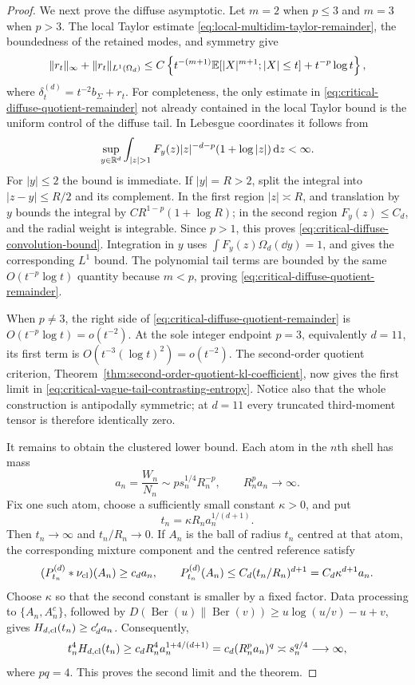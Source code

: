 \begin{proof}
We next prove the diffuse asymptotic.  Let
\(m=2\) when \(p\le3\) and \(m=3\) when \(p>3\).  The local Taylor estimate
\eqref{eq:local-multidim-taylor-remainder}, the boundedness of the retained
modes, and symmetry give
\begin{equation}\label{eq:critical-diffuse-quotient-remainder}
 \|r_t\|_\infty+\|r_t\|_{L^1(\Omega_d)}
 \le C\left\{
 t^{-(m+1)}\mathbb{E}[|X|^{m+1};|X|\le t]+t^{-p}\log t
 \right\},
\end{equation}
where
\(\delta_t^{(d)}=t^{-2}b_\Sigma+r_t\).  For completeness, the only
estimate in \eqref{eq:critical-diffuse-quotient-remainder} not already
contained in the local Taylor bound is the uniform control of the diffuse
tail.  In Lebesgue coordinates it follows from
\begin{equation}\label{eq:critical-diffuse-convolution-bound}
 \sup_{y\in\RR^d}\int_{|z|>1}F_y(z)|z|^{-d-p}
 (1+\log|z|)\dd z<\infty.
\end{equation}
For \(|y|\le2\) the bound is immediate.  If \(|y|=R>2\), split the
integral into \(|z-y|\le R/2\) and its complement.  In the first region
\(|z|\asymp R\), and translation by \(y\) bounds the integral by
\(CR^{1-p}(1+\log R)\); in the second region \(F_y(z)\le C_d\), and the
radial weight is integrable.  Since \(p>1\), this proves
\eqref{eq:critical-diffuse-convolution-bound}.  Integration in \(y\) uses
\(\int F_y(z)\Omega_d(\dd y)=1\), and gives the corresponding \(L^1\)
bound.  The polynomial tail terms are bounded by the same
\(O(t^{-p}\log t)\) quantity because \(m<p\), proving
\eqref{eq:critical-diffuse-quotient-remainder}.

When \(p\ne3\), the right side of
\eqref{eq:critical-diffuse-quotient-remainder} is
\(O(t^{-p}\log t)=o(t^{-2})\).  At the sole integer endpoint \(p=3\),
equivalently \(d=11\), its first term is
\(O(t^{-3}(\log t)^2)=o(t^{-2})\).  The second-order quotient criterion,
Theorem~\ref{thm:second-order-quotient-kl-coefficient}, now gives the first
limit in \eqref{eq:critical-vague-tail-contrasting-entropy}.  Notice also
that the whole construction is antipodally symmetric; at \(d=11\) every
truncated third-moment tensor is therefore identically zero.

It remains to obtain the clustered lower bound.  Each atom in the \(n\)th
shell has mass
\[
 a_n=\frac{W_n}{N_n}\sim p s_n^{1/4}R_n^{-p},
 \qquad R_n^pa_n\longrightarrow\infty.
\]
Fix one such atom, choose a sufficiently small constant \(\kappa>0\), and
put
\[
 t_n=\kappa R_na_n^{1/(d+1)}.
\]
Then \(t_n\to\infty\) and \(t_n/R_n\to0\).  If \(A_n\) is the ball of
radius \(t_n\) centred at that atom, the corresponding mixture component
and the centred reference satisfy
\[
 (P_{t_n}^{(d)}*\nu_{\rm cl})(A_n)\ge c_da_n,
 \qquad
 P_{t_n}^{(d)}(A_n)\le C_d(t_n/R_n)^{d+1}
 =C_d\kappa^{d+1}a_n.
\]
Choose \(\kappa\) so that the second constant is smaller by a fixed factor.
Data processing to \(\{A_n,A_n^c\}\), followed by
\(D(\operatorname{Ber}(u)\|\operatorname{Ber}(v))
\ge u\log(u/v)-u+v\), gives \(H_{d,{\rm cl}}(t_n)\ge c'_da_n\).
Consequently,
\[
 t_n^4H_{d,{\rm cl}}(t_n)
 \ge c_dR_n^4a_n^{1+4/(d+1)}
 =c_d(R_n^pa_n)^q
 \asymp s_n^{q/4}\longrightarrow\infty,
\]
where \(pq=4\).  This proves the second limit and the theorem.
\end{proof}

